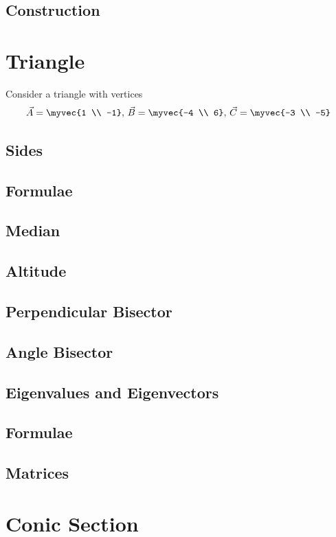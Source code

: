 \documentclass[journal]{IEEEtran}
\begin{document}
\subsection{Construction}

%
\appendices
\section{Triangle}
Consider a triangle with vertices
		\begin{align}
			\label{eq:app-tri-pts}
			\vec{A} = \myvec{1 \\ -1},\,
			\vec{B} = \myvec{-4 \\ 6},\,
			\vec{C} = \myvec{-3 \\ -5}
		\end{align}
\subsection{Sides}

\subsection{Formulae}

\subsection{Median}

\subsection{Altitude}

\subsection{Perpendicular Bisector}

\subsection{Angle Bisector}

\subsection{Eigenvalues and Eigenvectors}

\subsection{Formulae}

\subsection{Matrices}

\newpage
\section{Conic Section}

\end{document}
